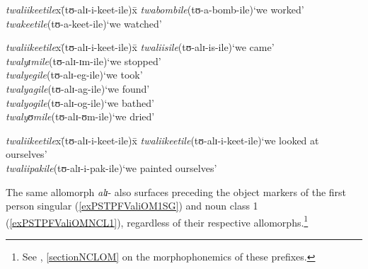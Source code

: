 \begin{exe}
\ex \label{exPSTPFValiConsonantInitial}
\begin{tabbing}
\textit{twaliikeetile}x\=(\degree tʊ-alɪ-i-keet-ile)x\=\kill
\textit{twabombile}\>(\degree tʊ-a-bomb-ile)\>`we worked'\\
\textit{twakeetile}\>(\degree tʊ-a-keet-ile)\>`we watched'
\end{tabbing}
\ex \label{exPSTPFValiVowelInitial}
\begin{tabbing}
\textit{twaliikeetile}x\=(\degree tʊ-alɪ-i-keet-ile)x\=\kill
\textit{twaliisile}\>(\degree tʊ-alɪ-is-ile)\>`we came'\\
\textit{twalyɪmile}\>(\degree tʊ-alɪ-ɪm-ile)\>`we stopped'\\
\textit{twalyegile}\>(\degree tʊ-alɪ-eg-ile)\>`we took'\\
\textit{twalyagile}\>(\degree tʊ-alɪ-ag-ile)\>`we found'\\
\textit{twalyogile}\>(\degree tʊ-alɪ-og-ile)\>`we bathed'\\
\textit{twalyʊmile}\>(\degree tʊ-alɪ-ʊm-ile)\>`we dried'
\end{tabbing}
\ex
\label{exPSTPFValiReflexive}
\begin{tabbing}
\textit{twaliikeetile}x\=(\degree tʊ-alɪ-i-keet-ile)x\=\kill
\textit{twaliikeetile}\>(\degree tʊ-alɪ-i-keet-ile)\>`we looked at ourselves'\\
\textit{twaliipakile}\>(\degree tʊ-alɪ-i-pak-ile)\>`we painted ourselves' 
\end{tabbing}
\end{exe}
The same allomorph \textit{alɪ}- also surfaces preceding the object markers of the first person singular (\ref{exPSTPFValiOM1SG}) and noun class 1 (\ref{exPSTPFValiOMNCL1}), regardless of their respective allomorphs.\footnote{See , \ref{sectionNCLOM} on the morphophonemics of these prefixes.}

